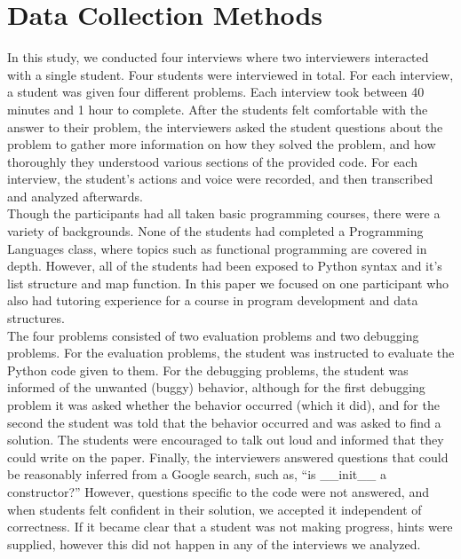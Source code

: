 \section{Data Collection Methods}


In this study, we conducted four interviews where two interviewers interacted with a single student. Four students were interviewed in total.
For each interview, a student was given four different problems. Each interview took between 40 minutes and 1 hour to complete.
After the students felt comfortable with the answer to their problem,
 the interviewers asked the student questions about the problem to gather more information on how they solved the problem,
 and how thoroughly they understood various sections of the provided code.
For each interview, the student's actions and voice were recorded, and then transcribed and analyzed afterwards. \\

Though the participants had all taken basic programming courses, there were a variety of backgrounds.
None of the students had completed a Programming Languages class, where topics such as functional programming are covered in depth.
However, all of the students had been exposed to Python syntax and it's list structure and map function.
In this paper we focused on one participant who also had tutoring experience for a course in program development and data structures. \\

The four problems consisted of two evaluation problems and two debugging problems.
For the evaluation problems, the student was instructed to evaluate the Python code given to them.
For the debugging problems, the student was informed of the unwanted (buggy) behavior,
 although for the first debugging problem it was asked whether the behavior occurred (which it did),
 and for the second the student was told that the behavior occurred and was asked to find a solution.
The students were encouraged to talk out loud and informed that they could write on the paper.
Finally, the interviewers answered questions that could be reasonably inferred from a Google search, such as,
``is \_\_init\_\_ a constructor?''
However, questions specific to the code were not answered, and when students felt confident in their solution, we accepted it independent of correctness.
If it became clear that a student was not making progress, hints were supplied, however this did not happen in any of the interviews we analyzed.

